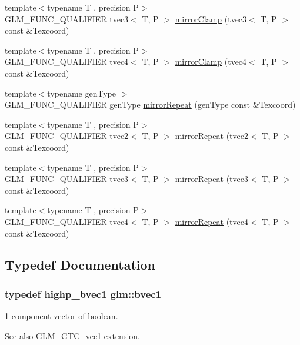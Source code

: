 \begin{DoxyCompactItemize}
{\footnotesize template$<$typename T , precision P$>$ }\\G\+L\+M\+\_\+\+F\+U\+N\+C\+\_\+\+Q\+U\+A\+L\+I\+F\+I\+E\+R tvec3$<$ T, P $>$ \hyperlink{namespaceglm_a351ab91b9a08eab89ea19fd541b1b03d}{mirror\+Clamp} (tvec3$<$ T, P $>$ const \&Texcoord)
\item 
{\footnotesize template$<$typename T , precision P$>$ }\\G\+L\+M\+\_\+\+F\+U\+N\+C\+\_\+\+Q\+U\+A\+L\+I\+F\+I\+E\+R tvec4$<$ T, P $>$ \hyperlink{namespaceglm_a34d59b331fd9c3f69c5921312c76da57}{mirror\+Clamp} (tvec4$<$ T, P $>$ const \&Texcoord)
\item 
{\footnotesize template$<$typename gen\+Type $>$ }\\G\+L\+M\+\_\+\+F\+U\+N\+C\+\_\+\+Q\+U\+A\+L\+I\+F\+I\+E\+R gen\+Type \hyperlink{group__gtx__wrap_ga16a89b0661b60d5bea85137bbae74d73}{mirror\+Repeat} (gen\+Type const \&Texcoord)
\item 
{\footnotesize template$<$typename T , precision P$>$ }\\G\+L\+M\+\_\+\+F\+U\+N\+C\+\_\+\+Q\+U\+A\+L\+I\+F\+I\+E\+R tvec2$<$ T, P $>$ \hyperlink{namespaceglm_a3ef76b9b162788aafa64b1483ad74269}{mirror\+Repeat} (tvec2$<$ T, P $>$ const \&Texcoord)
\item 
{\footnotesize template$<$typename T , precision P$>$ }\\G\+L\+M\+\_\+\+F\+U\+N\+C\+\_\+\+Q\+U\+A\+L\+I\+F\+I\+E\+R tvec3$<$ T, P $>$ \hyperlink{namespaceglm_a34a384753e18a9ffd563d655acd01ca3}{mirror\+Repeat} (tvec3$<$ T, P $>$ const \&Texcoord)
\item 
{\footnotesize template$<$typename T , precision P$>$ }\\G\+L\+M\+\_\+\+F\+U\+N\+C\+\_\+\+Q\+U\+A\+L\+I\+F\+I\+E\+R tvec4$<$ T, P $>$ \hyperlink{namespaceglm_a14141287fb517976eebbc9495bc29693}{mirror\+Repeat} (tvec4$<$ T, P $>$ const \&Texcoord)
\end{DoxyCompactItemize}


\subsection{Typedef Documentation}
\hypertarget{namespaceglm_a30260c045e085bb8d19eddca772cac61}{}
\subsubsection[{bvec1}]{\setlength{\rightskip}{0pt plus 5cm}typedef {\bf highp\+\_\+bvec1} {\bf glm\+::bvec1}}\label{namespaceglm_a30260c045e085bb8d19eddca772cac61}
1 component vector of boolean. \begin{DoxySeeAlso}{See also}
\hyperlink{group__gtc__vec1}{G\+L\+M\+\_\+\+G\+T\+C\+\_\+vec1} extension. 
\end{DoxySeeAlso}
\hypertarget{namespaceglm_a49693161673a003b4a8fd4d8b15b0b7b}{}
